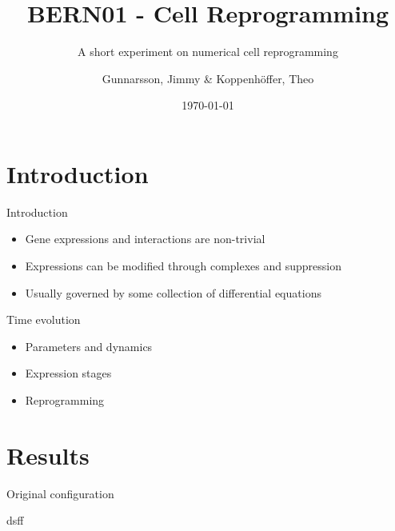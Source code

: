 \documentclass[aspectratio=169]{beamer}
\title[Cell Reprogramming]{BERN01 - Cell Reprogramming}
\author{Gunnarsson, Jimmy \& Koppenhöffer, Theo}
\subtitle{A short experiment on numerical cell reprogramming}
\date{\today}
\institute{Lund University\\Department of Mathematics}
\begin{document}
\section{Introduction}
\begin{frame}{Introduction}
			\begin{itemize}
				\item Gene expressions and interactions are non-trivial  
				\item Expressions can be modified through complexes and suppression 
				\item Usually governed by some collection of differential equations
			\end{itemize}
\end{frame} 
\begin{frame}{Time evolution}
    \begin{itemize}
        \item Parameters and dynamics 
        \item Expression stages  
        \item Reprogramming 
    \end{itemize}
\end{frame}
\section{Results}
\begin{frame}{Original configuration}

dsff

    
\end{frame}


%   

\nocite{*}
\printbibliography[]
\end{document}
